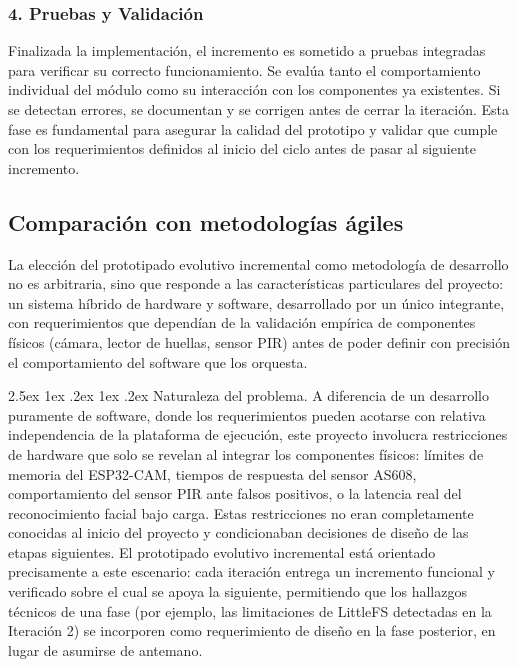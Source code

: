 \documentclass{iccmemoria}
\makeatletter
\renewcommand\paragraph{%
  \@startsection{paragraph}{4}{0pt}%
    {2.5ex \@plus 1ex \@minus .2ex}%
    {1ex \@plus .2ex}%
    {\normalfont\normalsize\bfseries}}
\makeatother
\begin{document}
\subsubsection*{4. Pruebas y Validación}
Finalizada la implementación, el incremento es sometido a pruebas integradas para verificar su correcto funcionamiento. Se evalúa tanto el comportamiento individual del módulo como su interacción con los componentes ya existentes. Si se detectan errores, se documentan y se corrigen antes de cerrar la iteración. Esta fase es fundamental para asegurar la calidad del prototipo y validar que cumple con los requerimientos definidos al inicio del ciclo antes de pasar al siguiente incremento.

\subsection{Comparación con metodologías ágiles}
\label{subsec:justificacion_metodologia}

La elección del prototipado evolutivo incremental como metodología de desarrollo no es arbitraria, sino que responde a las características particulares del proyecto: un sistema híbrido de hardware y software, desarrollado por un único integrante, con requerimientos que dependían de la validación empírica de componentes físicos (cámara, lector de huellas, sensor PIR) antes de poder definir con precisión el comportamiento del software que los orquesta.

\paragraph{Naturaleza del problema.} A diferencia de un desarrollo puramente de software, donde los requerimientos pueden acotarse con relativa independencia de la plataforma de ejecución, este proyecto involucra restricciones de hardware que solo se revelan al integrar los componentes físicos: límites de memoria del ESP32-CAM, tiempos de respuesta del sensor AS608, comportamiento del sensor PIR ante falsos positivos, o la latencia real del reconocimiento facial bajo carga. Estas restricciones no eran completamente conocidas al inicio del proyecto y condicionaban decisiones de diseño de las etapas siguientes. El prototipado evolutivo incremental está orientado precisamente a este escenario: cada iteración entrega un incremento funcional y verificado sobre el cual se apoya la siguiente, permitiendo que los hallazgos técnicos de una fase (por ejemplo, las limitaciones de LittleFS detectadas en la Iteración 2) se incorporen como requerimiento de diseño en la fase posterior, en lugar de asumirse de antemano.
\end{document}
